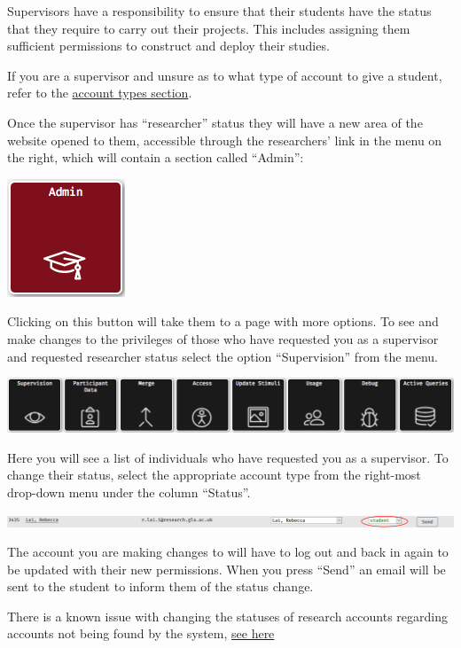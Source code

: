 \documentclass[]{book}
\begin{document}
Supervisors have a responsibility to ensure that their students have the
status that they require to carry out their projects. This includes
assigning them sufficient permissions to construct and deploy their
studies.

If you are a supervisor and unsure as to what type of account to give a
student, refer to the \protect\hyperlink{accounttypes}{account types
section}.

Once the supervisor has ``researcher'' status they will have a new area
of the website opened to them, accessible through the researchers' link
in the menu on the right, which will contain a section called ``Admin'':

\includegraphics{images/screenshots/admin_button.png}

Clicking on this button will take them to a page with more options. To
see and make changes to the privileges of those who have requested you
as a supervisor and requested researcher status select the option
``Supervision'' from the menu.

\includegraphics{images/screenshots/admin_options.png}

Here you will see a list of individuals who have requested you as a
supervisor. To change their status, select the appropriate account type
from the right-most drop-down menu under the column ``Status''.

\includegraphics{images/screenshots/status_bar.png}

The account you are making changes to will have to log out and back in
again to be updated with their new permissions. When you press ``Send''
an email will be sent to the student to inform them of the status
change.

\begin{bug}
There is a known issue with changing the statuses of research accounts
regarding accounts not being found by the system,
\protect\hyperlink{notfound}{see here}
\end{bug}
\end{document}
